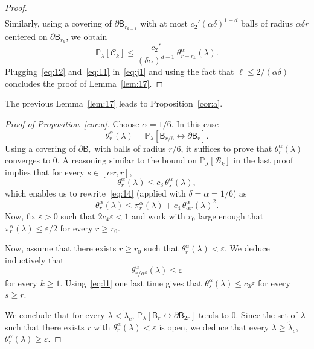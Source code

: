 \documentclass[10pt]{amsart}
\theoremstyle{definition}\newtheorem{defi}[theo]{Definition}\newtheorem{rema}[theo]{Remark}\newtheorem{exam}[theo]{Example}\newtheorem{exem}[theo]{Example}\newtheorem{nota}[theo]{Notation}
\newcommand{\ep}{\varepsilon}
\begin{document}
\begin{proof}
\begin{align}
\end{align}
Similarly, using a covering of $\partial\mathsf B_{r_{k+1}}$ with at most $c_2'(\alpha\delta)^{1-d}$ balls of radius $\alpha\delta r$ centered on $\partial \mathsf B_{r_k}$, we obtain
\begin{equation}\label{eq:11}
{\mathbb P}_\lambda[{\mathcal C}_k]\le \frac{c_2'}{(\delta\alpha)^{d-1}} \,\theta_{r-r_k}^\alpha(\lambda).
\end{equation}
Plugging~\eqref{eq:12} and~\eqref{eq:11} in~\eqref{eq:j1} and using the fact that $\ell\le 2/(\alpha\delta)$ concludes the proof of Lemma~\ref{lem:17}.
\end{proof}

The previous Lemma~\ref{lem:17} leads to Proposition~\ref{cor:a}.


\begin{proof}[Proof of Proposition~\ref{cor:a}]
Choose $\alpha=1/6$. In this case
\[
\theta_{r}^\alpha(\lambda)={\mathbb P}_\lambda[\mathsf B_{r/6}\longleftrightarrow\partial\mathsf B_{r}].
\]
Using a covering of $\partial\mathsf B_r$ with balls of radius $r/6$, it suffices to prove that $\theta_{r}^\alpha(\lambda)$ converges to $0$. A reasoning similar to the bound on ${\mathbb P}_\lambda[{\mathcal B}_k]$ in the last proof implies that for every $s\in[\alpha r, r]$,
\begin{equation}
\theta_r^\alpha(\lambda)\le c_3\,\theta_s^\alpha(\lambda),\label{eq:l1}
\end{equation}
which enables us to rewrite~\eqref{eq:14} (applied with $\delta=\alpha=1/6$) as
\[
\theta_r^\alpha(\lambda)\le \pi^{\alpha}_r(\lambda)+c_4 \,\theta^\alpha_{\alpha r}(\lambda)^2.
\]
Now, fix $\ep>0$ such that $2c_4\ep<1$ and work with $r_0$ large enough that $\pi^{\alpha}_r(\lambda)\le \ep/2$ for every $r\ge r_0$.

Now, assume that there exists $r\ge r_0$ such that $\theta_r^\alpha(\lambda)<\ep$. We deduce inductively that
\[
\theta_{r/\alpha^k}^\alpha(\lambda)\le \ep
\]
for every $k\ge1$.
Using~\eqref{eq:l1} one last time gives that $\theta_s^\alpha(\lambda)\le c_3\ep$ for every $s\ge r$.

We conclude that for every $\lambda<\widetilde \lambda_c$, ${\mathbb P}_\lambda[\mathsf B_r\longleftrightarrow\partial\mathsf B_{2r}]$ tends to 0. Since the set of $\lambda$ such that there exists $r$ with $\theta_r^\alpha(\lambda)<\ep$ is open, we deduce that every $\lambda\ge\widetilde\lambda_c$, $\theta_r^\alpha(\lambda)\ge\ep$.
\end{proof}
\end{document}
